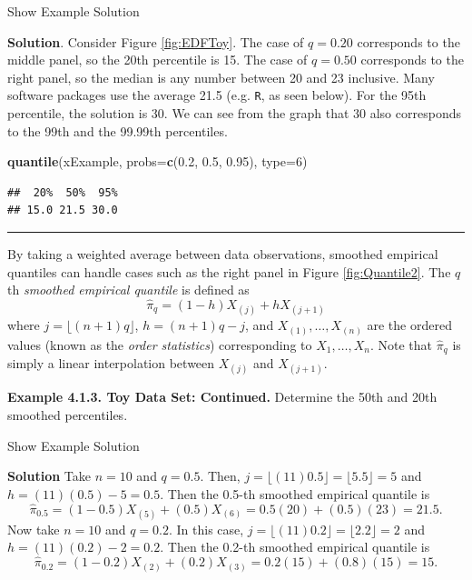 \documentclass[]{book}
\newenvironment{Shaded}{\begin{snugshade}}{\end{snugshade}}
\newcommand{\KeywordTok}[1]{\textcolor[rgb]{0.13,0.29,0.53}{\textbf{#1}}}
\newcommand{\DataTypeTok}[1]{\textcolor[rgb]{0.13,0.29,0.53}{#1}}
\newcommand{\DecValTok}[1]{\textcolor[rgb]{0.00,0.00,0.81}{#1}}
\newcommand{\FloatTok}[1]{\textcolor[rgb]{0.00,0.00,0.81}{#1}}
\newcommand{\NormalTok}[1]{#1}
\theoremstyle{definition}
\theoremstyle{definition}
\theoremstyle{definition}
\theoremstyle{remark}
\begin{document}
Show Example Solution

\hypertarget{toggleExampleSelect.1.2}{}
\textbf{Solution}. Consider Figure \ref{fig:EDFToy}. The case of
\(q=0.20\) corresponds to the middle panel, so the 20th percentile is
15. The case of \(q=0.50\) corresponds to the right panel, so the median
is any number between 20 and 23 inclusive. Many software packages use
the average 21.5 (e.g. \texttt{R}, as seen below). For the 95th
percentile, the solution is 30. We can see from the graph that 30 also
corresponds to the 99th and the 99.99th percentiles.

\begin{Shaded}
\begin{Highlighting}[]
\KeywordTok{quantile}\NormalTok{(xExample, }\DataTypeTok{probs=}\KeywordTok{c}\NormalTok{(}\FloatTok{0.2}\NormalTok{, }\FloatTok{0.5}\NormalTok{, }\FloatTok{0.95}\NormalTok{), }\DataTypeTok{type=}\DecValTok{6}\NormalTok{)}
\end{Highlighting}
\end{Shaded}

\begin{verbatim}
##  20%  50%  95% 
## 15.0 21.5 30.0
\end{verbatim}

\begin{center}\rule{0.5\linewidth}{\linethickness}\end{center}

By taking a weighted average between data observations, smoothed
empirical quantiles can handle cases such as the right panel in Figure
\ref{fig:Quantile2}. The \(q\)th \emph{smoothed empirical quantile} is
defined as \[
\hat{\pi}_q = (1-h) X_{(j)} + h X_{(j+1)}
\] where \(j=\lfloor(n+1)q\rfloor\), \(h=(n+1)q-j\), and
\(X_{(1)}, \ldots, X_{(n)}\) are the ordered values (known as the
\emph{order statistics}) corresponding to \(X_1, \ldots, X_n\). Note
that \(\hat{\pi}_q\) is simply a linear interpolation between
\(X_{(j)}\) and \(X_{(j+1)}\).

\textbf{Example 4.1.3. Toy Data Set: Continued.} Determine the 50th and
20th smoothed percentiles.

Show Example Solution

\hypertarget{toggleExampleSelect.1.3}{}
\textbf{Solution} Take \(n=10\) and \(q=0.5\). Then,
\(j=\lfloor(11)0.5 \rfloor= \lfloor5.5 \rfloor=5\) and
\(h=(11)(0.5)-5=0.5\). Then the 0.5-th smoothed empirical quantile is
\[\hat{\pi}_{0.5} = (1-0.5) X_{(5)} + (0.5) X_{(6)} = 0.5 (20) + (0.5)(23) = 21.5.\]
Now take \(n=10\) and \(q=0.2\). In this case,
\(j=\lfloor(11)0.2\rfloor=\lfloor 2.2 \rfloor=2\) and
\(h=(11)(0.2)-2=0.2\). Then the 0.2-th smoothed empirical quantile is
\[\hat{\pi}_{0.2} = (1-0.2) X_{(2)} + (0.2) X_{(3)} = 0.2 (15) + (0.8)(15) = 15.\]
\end{document}
